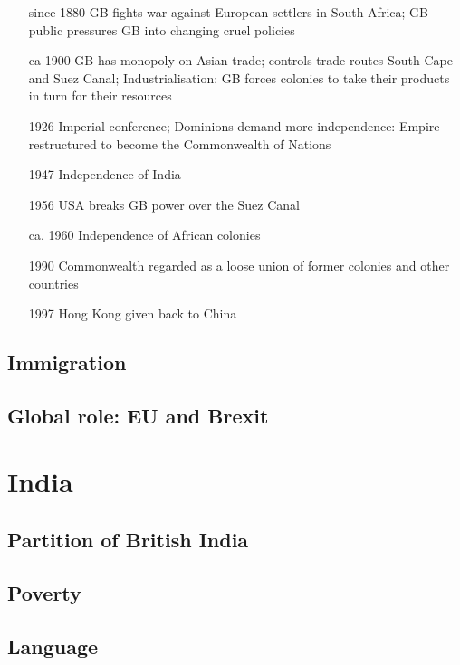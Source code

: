 \documentclass[10pt]{article}
\begin{document}
\begin{itemize}[leftmargin=5pt+]
\item[since 1880] GB fights war against European settlers in South Africa; GB public pressures GB into changing cruel policies
\item[ca 1900] GB has monopoly on Asian trade; controls trade routes South Cape and Suez Canal; Industrialisation: GB forces colonies to take their products in turn for their resources
\item[1926] Imperial conference; Dominions demand more independence: Empire restructured to become the Commonwealth of Nations 
\item[1947] Independence of India
\item[1956] USA breaks GB power over the Suez Canal
\item[ca. 1960] Independence of African colonies
\item[1990] Commonwealth regarded as a loose union of former colonies and other countries
\item[1997] Hong Kong given back to China 
\end{itemize}


	\label{ssec:uk@empire}
\subsection{Immigration}
	\label{ssec:uk@immig}
\subsection{Global role: EU and Brexit}
	\label{ssec:uk@brexit}

\section{India}
	\label{sec:india}
\subsection{Partition of British India}
	\label{ssec:india@britindia}
\subsection{Poverty}
	\label{ssec:india@poverty}
\subsection{Language}
	\label{ssec:india@language}
\end{document}
